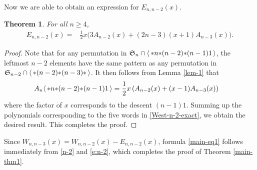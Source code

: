 \documentclass[11pt]{article}
\newtheorem{thm}{Theorem}
\newcommand{\sym}{\mathfrak{S}}
\newcommand{\st}{\mbox{\ensuremath{\ast}}}
\newcommand{\+}{\mbox{\ensuremath{\scriptstyle{+}}}}
\newcommand{\glob}[1]{\ensuremath{\langle\, #1\,\rangle}}
\begin{document}
Now we are able to obtain an expression for $ E_{n,n-2}(x)$.
\begin{thm}\label{thm-1}
	For all $n \ge 4$,
	\begin{align} \label{e:n-2}
		E_{n,n-2}(x)= & \frac{1}{2} x \big( 3 A_{n-2}(x) + (2 n-3) (x+1) A_{n-3}(x) \big).
	\end{align}
\end{thm}

\begin{proof}
	Note that  for any permutation in $\sym_n \cap    \glob{\st n\st (n-2)\st (n-1)1}$, the leftmost $n-2$ elements have the same pattern as any permutation in
	$\sym_{n-2} \cap    \glob{\st (n-2) \st (n-3)\st}$.
	It then follows from  Lemma \ref{lem-1} that
	\begin{align*}
		A_n \glob{\st n\st (n-2)\st (n-1)1} & = \frac{1}{2} x \left( A_{n-2}(x) + (x-1) A_{n-3}(x) \right)
	\end{align*}
	where the factor of $x$ corresponds to the descent $(n-1)1$. Summing up the polynomials corresponding to the five words in \eqref{West-n-2-exact}, we obtain the desired result.
	This completes the proof.
\end{proof}


Since $W_{n,n-3}(x)   = W_{n,n-2}(x) - E_{n,n-2}(x)$,
formula \eqref{main-eq1} follows immediately from \eqref{n-2} and \eqref{e:n-2}, which completes the proof of  Theorem \ref{main-thm1}.
\end{document}
